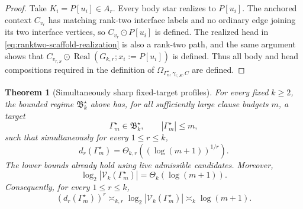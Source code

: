 \documentclass[11pt]{article}
\newtheorem{theorem}{Theorem}[section]
\theoremstyle{definition}
\theoremstyle{remark}
\newcommand{\Real}{\operatorname{Real}}
\begin{document}
\begin{proof}
Take \(K_i=P[u_i]\in A_r\).  Every body star realizes to \(P[u_i]\).
The anchored context \(C_{v_r}\) has matching rank-two interface labels and
no ordinary edge joining its two interface vertices, so
\(C_{v_r}\odot P[u_i]\)
is defined.  The realized head in
\eqref{eq:ranktwo-scaffold-realization} is also a rank-two path, and the same
argument shows that
\(C_{v_{r,S}}\odot\Real(G_{k,r};x_i:=P[u_i])\)
is defined.  Thus all body and head compositions required in the definition
of \(\Omega_{\Gamma_n^\star,\gamma_{r,S},C}\) are defined.
\end{proof}

\begin{theorem}[Simultaneously sharp fixed-target profiles]
\label{thm:simultaneous-fixed-target}
For every fixed \(k\ge2\), the bounded regime
\(\mathfrak B_k^\star\) above has, for all sufficiently large clause budgets \(m\),
a target
\[
\Gamma_m^\star\in\mathfrak B_k^\star,
\qquad
|\Gamma_m^\star|\le m,
\]
such that simultaneously for every \(1\le r\le k\),
\[
\boxed{
d_r(\Gamma_m^\star)
=
\Theta_{k,r}
\!\left((\log(m+1))^{1/r}\right).
}
\]
The lower bounds already hold using live admissible candidates.  Moreover,
\[
\boxed{
\log_2|\mathcal V_k(\Gamma_m^\star)|
=
\Theta_k(\log(m+1)).
}
\]
Consequently, for every \(1\le r\le k\),
\[
\boxed{
(d_r(\Gamma_m^\star))^r
\asymp_{k,r}
\log_2|\mathcal V_k(\Gamma_m^\star)|
\asymp_k
\log(m+1).
}
\]
\end{theorem}
\end{document}
